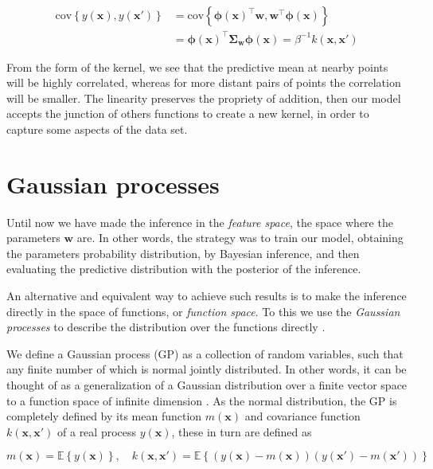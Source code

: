 \documentclass[11pt]{article} %
\begin{document}
\begin{equation}
   \begin{aligned}
      \mathrm{cov}\left\{ y(\mathbf{x}), y(\mathbf{x'})\right\} &=\mathrm{cov} \left\{ \boldsymbol{\phi}(\mathbf{x})^\top \mathbf{w}, \mathbf{w}^\top \boldsymbol{\phi}(\mathbf{x}) \right\} \\
       &= \boldsymbol{\phi}(\mathbf{x})^\top \boldsymbol{\Sigma}_\mathbf{w}\boldsymbol{\phi}(\mathbf{x}) = \beta^{-1}k(\mathbf{x},\mathbf{x'})
   \end{aligned}
\end{equation}

From the form of the kernel, we see that the predictive mean at nearby points will be highly correlated, whereas for more distant pairs of points the correlation will be smaller. The linearity preserves the propriety of addition, then our model accepts the junction of others functions to create a new kernel, in order to capture some aspects of the data set. 

\section{Gaussian processes}

Until now we have made the inference in the \textit{feature space}, the space where the parameters $\mathbf{w}$ are. In other words, the strategy was to train our model, obtaining the parameters probability distribution, by Bayesian inference, and then evaluating the predictive distribution with the posterior of the inference.

An alternative and equivalent way to achieve such results is to make the inference directly in the space of functions, or \textit{function space}. To this we use the \textit{Gaussian processes} to describe the distribution over the functions directly \cite{Rasmussen:2005:GPM:1162254}.

We define a Gaussian process (GP) as a collection of random variables, such that any finite number of which is normal jointly distributed. In other words, it can be thought  of as a generalization of a Gaussian distribution over a finite vector space to a function space of infinite dimension \cite{mackay1998introduction}. As the normal distribution, the GP is completely defined by its mean function $m(\mathbf{x})$ and covariance function $k(\mathbf{x},\mathbf{x'})$ of a real process $y(\mathbf{x})$, these in turn are defined as

\begin{equation}
   m(\mathbf{x}) = \mathbb{E}\left\{ y(\mathbf{x}) \right\}, \quad
   k(\mathbf{x},\mathbf{x'}) = \mathbb{E}\left\{ \left( y(\mathbf{x}) - m(\mathbf{x}) \right) \left( y(\mathbf{x'}) - m(\mathbf{x'}) \right) \right\}
\end{equation}
\end{document}
